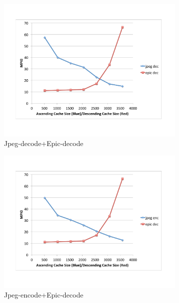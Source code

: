\documentclass{acm_proc_article-sp}
\begin{document}
\begin{figure}
\begin{subfigure}[b]{0.22\textwidth}
    \includegraphics[width=\textwidth]{figs/jpeg-decode+epic-decode.pdf}
    \caption{Jpeg-decode+Epic-decode}
    \label{fig:jpeg-decode-epic-decode}
  \end{subfigure}%
  \begin{subfigure}[b]{0.22\textwidth}
    \includegraphics[width=\textwidth]{figs/jpeg-encode+epic-decode.pdf}
    \caption{Jpeg-encode+Epic-decode}
    \label{fig:jpeg-encode-epic-decode}
  \end{subfigure}
  \begin{subfigure}[b]{0.22\textwidth}

\end{subfigure}
\end{figure}
\end{document}
